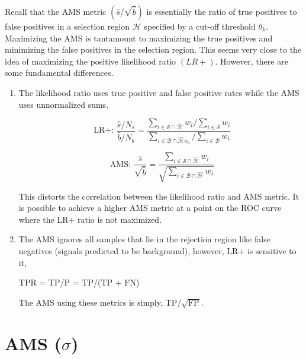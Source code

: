 Recall that the AMS metric $(\hat{s}/\sqrt{\hat{b}})$ is essentially the ratio of true positives to false positives in a selection region $\mathcal{H}$ specified by a cut-off threshold $\theta_{k}$. Maximizing the AMS is tantamount to maximizing the true positives and minimizing the false positives in the selection region. This seems very close to the idea of maximizing the positive likelihood ratio $(LR+)$. However, there are some fundamental differences.

\begin{enumerate}
\item The likelihood ratio uses true positive and false positive rates while the AMS uses unnormalized sums.

\begin{equation}
\textrm{ LR+: } \dfrac{\hat{s}/N_{s}}{\hat{b}/N_{b}} = \frac{\sum_{i \in \mathcal{S}\cap\hat{\mathcal{H}}} w_{i}/\sum_{i \in \mathcal{S}}w_{i}}{\sum_{i \in \mathcal{B}\cap\hat{\mathcal{H}} w_{i}}/\sum_{i \in \mathcal{B}}w_{i}}
\end{equation}

\begin{displaymath}
\textrm{ AMS: }\frac{\hat{s}}{\sqrt{\hat{b}}} = \frac{\sum_{i \in \mathcal{S}\cap\hat{\mathcal{H}}} w_{i}}{\sqrt{\sum_{i \in \mathcal{B}\cap\hat{\mathcal{H}}} w_{i}}}
\end{displaymath}

This distorts the correlation between the likelihood ratio and AMS metric. It is possible to achieve a higher AMS metric at a point on the ROC curve where the LR+ ratio is not maximized.

\item{The AMS ignores all samples that lie in the rejection region like false negatives (signals predicted to be background), however, LR+ is sensitive to it,
\begin{center}
TPR = TP/P = TP/(TP + FN)
\end{center}} 
The AMS using these metrics is simply, TP/$\sqrt{\textrm{FP}}$.

\end{enumerate}

\section{AMS (\texorpdfstring{$\sigma$}{s})}

\label{metrics}

